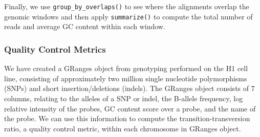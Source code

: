 \documentclass[]{article}
\newenvironment{Shaded}{\begin{snugshade}}{\end{snugshade}}
\newcommand{\DataTypeTok}[1]{\textcolor[rgb]{0.13,0.29,0.53}{#1}}
\newcommand{\KeywordTok}[1]{\textcolor[rgb]{0.13,0.29,0.53}{\textbf{#1}}}
\newcommand{\NormalTok}[1]{#1}
\newcommand{\OperatorTok}[1]{\textcolor[rgb]{0.81,0.36,0.00}{\textbf{#1}}}
\newcommand{\OtherTok}[1]{\textcolor[rgb]{0.56,0.35,0.01}{#1}}
\newcommand{\StringTok}[1]{\textcolor[rgb]{0.31,0.60,0.02}{#1}}
\begin{document}
\begin{Shaded}
\end{Shaded}

Finally, we use \texttt{group\_by\_overlaps()} to see where the
alignments overlap the genomic windows and then apply
\texttt{summarize()} to compute the total number of reads and average GC
content within each window.

\begin{Shaded}
\end{Shaded}

\hypertarget{quality-control-metrics}{%
\subsubsection{Quality Control Metrics}\label{quality-control-metrics}}

We have created a GRanges object from genotyping performed on the H1
cell line, consisting of approximately two million single nucleotide
polymorphisms (SNPs) and short insertion/deletions (indels). The GRanges
object consists of 7 columns, relating to the alleles of a SNP or indel,
the B-allele frequency, log relative intensity of the probes, GC content
score over a probe, and the name of the probe. We can use this
information to compute the transition-transversion ratio, a quality
control metric, within each chromosome in GRanges object.
\end{document}

